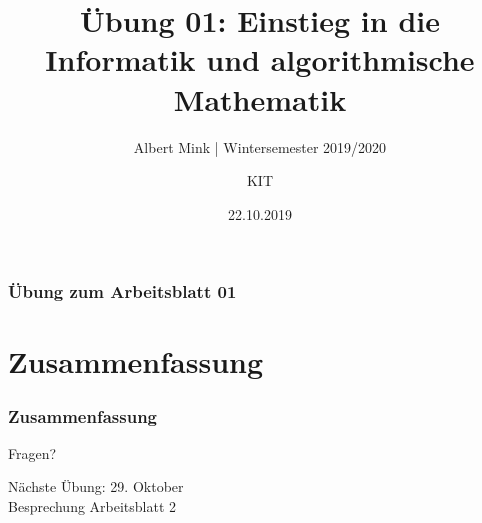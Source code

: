 \documentclass[c,18pt]{beamer}
\date{22.10.2019}
\title[Übung 01: Einstieg in die Informatik und algorithmische Mathematik]
  {Übung 01: Einstieg in die Informatik und algorithmische Mathematik}
\subtitle{Albert Mink | Wintersemester 2019/2020}
\author[Albert Mink, ]{KIT}
\institute[Institut für Angewandte und Numerische Mathematik (IANM)]{Institut für Angewandte und Numerische Mathematik}
\begin{document}
\begin{frame}
  \maketitle
\end{frame}

\begin{frame}
  \frametitle{Übung zum Arbeitsblatt 01}%
\tableofcontents[hideallsubsections]
\end{frame}

\def\kap{1}

\setcounter{exercise}{1}

\setcounter{exercise}{2}

\setcounter{exercise}{3}

\def\kap{2}%

\section{Zusammenfassung}
\begin{frame}
  \frametitle{Zusammenfassung}%
\tableofcontents[hideallsubsections]
\end{frame}

\begin{frame}
\centering
\Huge\textcolor{KITgreen}{Fragen?}
\vspace{2cm}

{\LARGE
Nächste Übung: 29. Oktober\\
Besprechung Arbeitsblatt 2
}
\end{frame}


\end{document}
